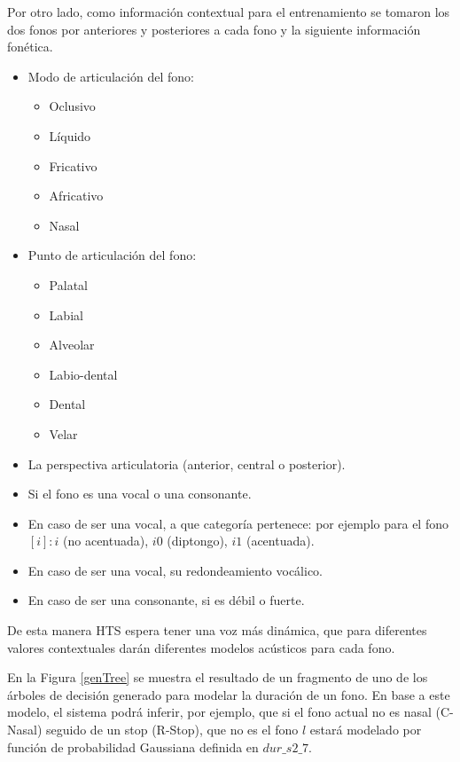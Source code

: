 Por otro lado, como información contextual para el entrenamiento se tomaron los dos fonos por anteriores y posteriores a cada fono y la siguiente información fonética.

\begin{itemize}
\item Modo de articulación del fono:
\begin{itemize}
\item Oclusivo
\item Líquido
\item Fricativo
\item Africativo
\item Nasal
\end{itemize}
\item Punto de articulación del fono:
\begin{itemize}
\item Palatal
\item Labial
\item Alveolar
\item Labio-dental
\item Dental
\item Velar
\end{itemize}
\item La perspectiva articulatoria (anterior, central o posterior).
\item Si el fono es una vocal o una consonante.
\item En caso de ser una vocal, a que categoría pertenece: por ejemplo para el fono $[i]:${$i$ (no acentuada), $i0$ (diptongo), $i1$ (acentuada)}.
\item En caso de ser una vocal, su redondeamiento vocálico.
\item En caso de ser una consonante, si es débil o fuerte.
\end{itemize}

De esta manera HTS espera tener una voz más dinámica, que para diferentes valores contextuales darán diferentes modelos acústicos para cada fono.

En la Figura \ref{genTree} se muestra el resultado de un fragmento de uno de los árboles de decisión generado para modelar la duración de un fono. En base a este modelo, el sistema podrá inferir, por ejemplo, que si el fono actual no es nasal (C-Nasal) seguido de un stop (R-Stop), que no es el fono $l$ estará modelado por función de probabilidad Gaussiana definida en $dur\_s2\_7$.

